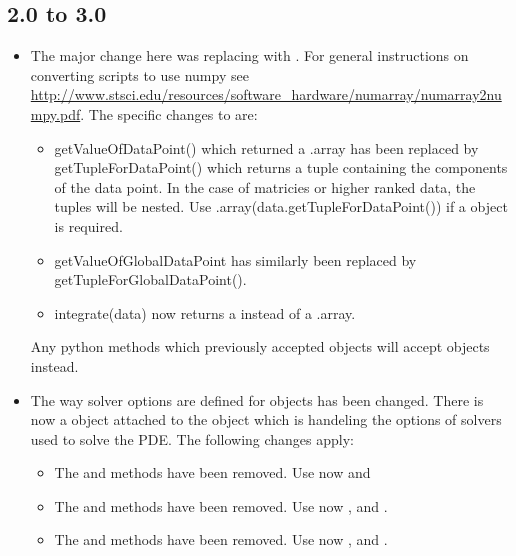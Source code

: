 \subsection*{2.0 to 3.0}
\begin{itemize}
\item The major change here was replacing  with \numpy.
For general instructions on converting scripts to use numpy see \url{http://www.stsci.edu/resources/software_hardware/numarray/numarray2numpy.pdf}.
The specific changes to \escript are:
\begin{itemize}
  \item getValueOfDataPoint() which returned a .array has been replaced by
 getTupleForDataPoint() which returns a \PYTHON tuple containing
the components of the data point. In the case of matricies or higher ranked data, the tuples will be nested. Use 
\numpy.array(data.getTupleForDataPoint()) if a \numpyNDA object is required.
 \item getValueOfGlobalDataPoint has similarly been replaced by getTupleForGlobalDataPoint().
 \item integrate(data) now returns a \numpyNDA instead of a .array.
\end{itemize}
Any python methods which previously accepted  objects will accept \numpy objects instead.

\item
The way solver options are defined for \LinearPDE objects has been changed. There is now a \SolverOptions object attached to the \LinearPDE object which is handeling the options of solvers used to solve the PDE. The following changes apply:  
\begin{itemize}
\item The  and  methods have been removed. Use now  
and 

\item The  and  methods have been removed. Use now ,
 and
.

\item The  and  methods have been removed. Use now ,
 and
.


\end{itemize}
\end{itemize}
